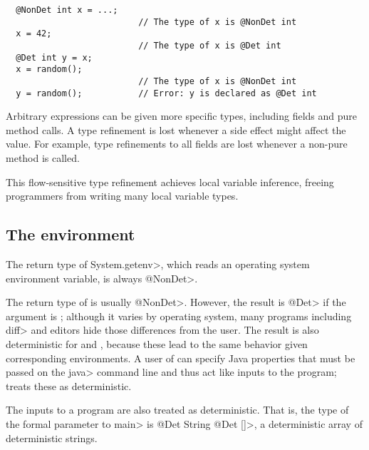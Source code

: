 \begin{verbatim}
  @NonDet int x = ...;
                          // The type of x is @NonDet int
  x = 42;
                          // The type of x is @Det int
  @Det int y = x;
  x = random();
                          // The type of x is @NonDet int
  y = random();           // Error: y is declared as @Det int
\end{verbatim}

Arbitrary expressions can be given more specific types, including fields
and pure method calls.  A type refinement is lost whenever a side effect
might affect the value.  For example, type refinements to all fields are
lost whenever a non-pure method is called.

This flow-sensitive type refinement achieves local variable inference,
freeing programmers from writing many local variable types.


\subsection{The environment}\label{sec:environment-java}

The return type of \<System.getenv>, which reads an operating system
environment variable, is always \<@NonDet>.

The return type of  is usually \<@NonDet>. However,
the result is \<@Det> if the argument is ; although
it varies by operating system, many programs including \<diff> and editors hide those
differences from the user.
The result is also deterministic for  and
, because these lead to the same behavior given
corresponding environments.
A user of \theDeterminismChecker can specify Java properties that must be passed on the \<java>
command line and thus act like inputs to the program;
\theDeterminismChecker treats these as deterministic.

The inputs to a program are also treated as deterministic.  That is, the type of
the formal parameter to \<main> is
\<@Det String @Det []>, a deterministic array of deterministic strings.


